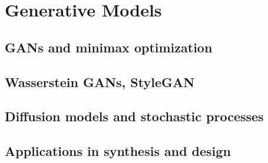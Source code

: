 ﻿\chapter{Generative Models}
\section{GANs and minimax optimization}

\section{Wasserstein GANs, StyleGAN}

\section{Diffusion models and stochastic processes}

\section{Applications in synthesis and design}


